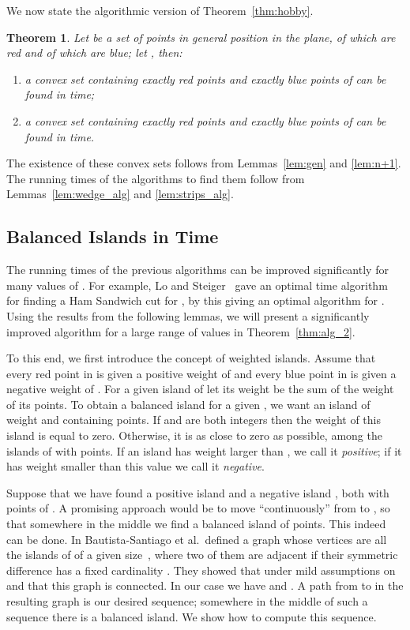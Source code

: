 \documentclass{article}
\newtheorem{theorem}{Theorem}
\def\QED{\ensuremath{{\square}}}
\def\markatright#1{\leavevmode\unskip\nobreak\quad\hspace*{\fill}{#1}}
\newenvironment{proof}
  {\begin{trivlist}\item[\hskip\labelsep{\bf Proof.}]}
  {\markatright{\QED}\end{trivlist}}
\begin{document}
We now state the algorithmic version of Theorem~\ref{thm:hobby}.
\begin{theorem}\label{thm:hobby_alg}
Let  be a set of  points in general position in the plane,
 of which are red and  of which are blue; 
let , then:
\begin{enumerate}
  \item  a convex set containing exactly  red points
and exactly  blue points of  can be found in  time;

  \item a convex set containing exactly  red points
and exactly  blue points of  can be found in  time.
\end{enumerate}
\end{theorem}
\begin{proof}
The existence of these convex sets follows from Lemmas~\ref{lem:gen} and \ref{lem:n+1}.
The running times of the algorithms to find them follow from  Lemmas~\ref{lem:wedge_alg} 
and \ref{lem:strips_alg}.
\end{proof}



\subsection{Balanced Islands in  Time}

The running times of the previous algorithms can be improved significantly for many values of .  
For example, Lo and Steiger~\cite{ham_alg} gave an optimal  time algorithm for finding a Ham Sandwich cut for , by this giving an optimal algorithm for .
Using the results from the following lemmas, we will present a significantly improved algorithm for a large range of values  in Theorem~\ref{thm:alg_2}.  


To this end, we first introduce the concept of weighted islands. 
Assume that every red point in  is given a positive weight of  and every blue point in  is given a negative weight of . 
For a given island of  let its weight be the sum of the weight of its points.
To obtain a balanced island for a given , we want 
	an island of weight  
	and containing  points. 
If  and   are both integers then the weight of this island is equal to zero. 
Otherwise, it is as close to zero as possible, among the islands of  with   points.
If an island has weight larger than , we call it \emph{positive}; 
if it has weight smaller than this value we call it \emph{negative}. 

Suppose that we have found a positive island  and a negative island , both with   points of . 
A promising approach would be to move ``continuously'' from  to , so that somewhere in the middle 
	we find a balanced island of  points.
This indeed can be done. In \cite{island_graph} Bautista-Santiago et al.\ defined a graph whose vertices are all the islands of  of a given size~, 
	where two of them are adjacent if their symmetric difference has a fixed cardinality . 
They showed that under mild assumptions on  and  that this graph is connected. 
In our case we have  and . 
A path from  to  in the resulting graph is our desired sequence; somewhere in the middle of such a sequence there is a balanced island. 
We show how to compute this sequence.
\end{document}
